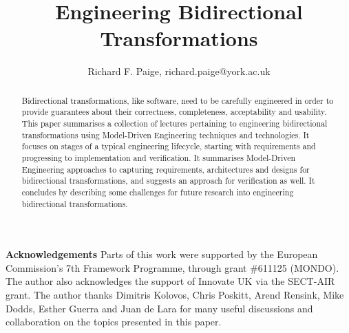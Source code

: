 \documentclass[runningheads,a4paper]{llncs}
\begin{document}
\title{Engineering Bidirectional Transformations}

\author{
Richard F. Paige, richard.paige@york.ac.uk}
%

\maketitle

\begin{abstract}
Bidirectional transformations, like software, need to be carefully engineered in order to provide guarantees about their correctness, completeness, acceptability and usability. This paper summarises a collection of lectures pertaining to engineering bidirectional transformations using Model-Driven Engineering techniques and technologies. It focuses on stages of a typical engineering lifecycle, starting with requirements and progressing to implementation and verification. It summarises Model-Driven Engineering approaches to capturing requirements, architectures and designs for bidirectional transformations, and suggests an approach for verification as well. It concludes by describing some challenges for future research into engineering bidirectional transformations.
\end{abstract}













\paragraph*{}\textbf{Acknowledgements} Parts of this work were supported by the European Commission's 7th Framework Programme, through grant \#611125 (MONDO). The author also acknowledges the support of Innovate UK via the SECT-AIR grant. The author thanks Dimitris Kolovos, Chris Poskitt, Arend Rensink, Mike Dodds, Esther Guerra and Juan de Lara for many useful discussions and collaboration on the topics presented in this paper.


\end{document}
